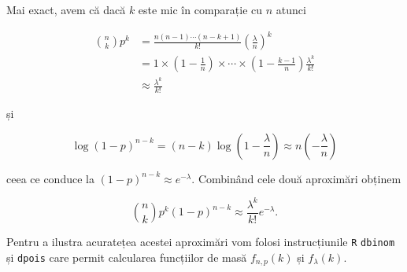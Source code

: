 \documentclass[]{article}
\begin{document}
Mai exact, avem că dacă \(k\) este mic în comparație cu \(n\) atunci

\begin{align*}
  \binom{n}{k}p^k &= \frac{n(n-1)\cdots(n-k+1)}{k!}\left(\frac{\lambda}{n}\right)^k \\
                  &= 1\times\left(1-\frac{1}{n}\right)\times\cdots\times\left(1-\frac{k-1}{n}\right)\frac{\lambda^k}{k!}\\
                  &\approx \frac{\lambda^k}{k!}
\end{align*}

și

\[
  \log(1-p)^{n-k} = (n-k)\log\left(1-\frac{\lambda}{n}\right)\approx n\left(-\frac{\lambda}{n}\right)
\]

ceea ce conduce la \((1-p)^{n-k}\approx e^{-\lambda}\). Combinând cele
două aproximări obținem

\[
  \binom{n}{k}p^k(1-p)^{n-k} \approx \frac{\lambda^k}{k!}e^{-\lambda}.
\]

Pentru a ilustra acuratețea acestei aproximări vom folosi instrucțiunile
\texttt{R} \texttt{dbinom} și \texttt{dpois} care permit calcularea
funcțiilor de masă \(f_{n,p}(k)\) și \(f_{\lambda}(k)\).
\end{document}
